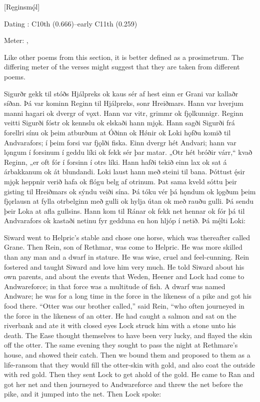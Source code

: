 [Ręginsmǫ́l]

\begin{flushright}%
Dating \parencite{Sapp2022}: C10th (0.666)–early C11th (0.259)

Meter: \Ljodahattr, \Fornyrdislag%
\end{flushright}

Like other poems from this section, it is better defined as a prosimetrum. The differing meter of the verses might suggest that they are taken from different poems.

\sectionline

\bpg\bpa Sigurðr gekk til stóðs Hjálpreks ok kaus sér af hest einn er Grani var kallaðr síðan. Þá var kominn Reginn til Hjálpreks, sonr Hreiðmars. Hann var hverjum manni hagari ok dvergr of vǫxt. Hann var vitr, grimmr ok fjǫlkunnigr. Reginn veitti Sigurði fóstr ok kennslu ok elskaði hann mjǫk. Hann sagði Sigurði frá forellri sínu ok þeim atburðum at Óðinn ok Hǿnir ok Loki hǫfðu komið til Andvarafors; í þeim forsi var fjǫlði fiska. Einn dvergr hét Andvari; hann var lǫngum í forsinum í geddu líki ok fekk sér þar matar. „Otr hét bróðir várr,“ kvað Reginn, „er oft fór í forsinn í otrs líki. Hann hafði tekið einn lax ok sat á árbakkanum ok át blundandi. Loki laust hann með steini til bana. Þóttust ę́sir mjǫk heppnir verið hafa ok flógu belg af otrinum. Þat sama kveld sóttu þeir gisting til Hreiðmars ok sýndu veiði sína. Þá tóku vér þá hǫndum ok lǫgðum þeim fjǫrlausn at fylla otrbelginn með gulli ok hylja útan ok með rauðu gulli. Þá sendu þeir Loka at afla gullsins. Hann kom til Ránar ok fekk net hennar ok fór þá til Andvarafors ok kastaði netinu fyr gedduna en hon hljóp í netið. Þá mę́lti Loki:\epa

\bpb Siward went to Helpric’s stable and chose one horse, which was thereafter called Grane. Then Rein, son of Rethmar, was come to Helpric. He was more skilled than any man and a dwarf in stature. He was wise, cruel and feel-cunning. Rein fostered and taught Siward and love him very much. He told Siward about his own parents, and about the events that Weden, Heener and Lock had come to Andwareforce; in that force was a multitude of fish. A dwarf was named Andware; he was for a long time in the force in the likeness of a pike and got his food there. “Otter was our brother called,” said Rein, “who often journeyed in the force in the likeness of an otter. He had caught a salmon and sat on the riverbank and ate it with closed eyes Lock struck him with a stone unto his death. The Ease thought themselves to have been very lucky, and flayed the skin off the otter. The same evening they sought to pass the night at Rethmare’s house, and showed their catch. Then we bound them and proposed to them as a life-ransom that they would fill the otter-skin with gold, and also coat the outside with red gold. Then they sent Lock to get ahold of the gold. He came to Ran and got her net and then journeyed to Andwareforce and threw the net before the pike, and it jumped into the net. Then Lock spoke:\epb\epg


